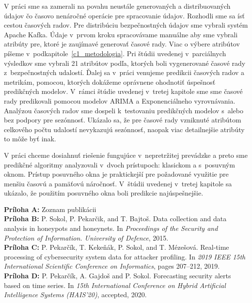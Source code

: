 \documentclass[thesismargins, thesislinespacing, openright, upjsfrontpage]{rnthesis}
\begin{document}
V práci sme sa zamerali na povahu neustále generovaných a distribuovaných údajov čo časovo nenáročné operácie pre spracovanie údajov. Rozhodli sme sa ísť cestou časových radov. Pre distribúciu bezpečnostných údajov sme vybrali systém Apache Kafka. Údaje v~prvom kroku spracovávame manuálne aby sme vybrali atribúty pre, ktoré je zaujímavé generovať časové rady. Viac o výbere atribútov píšeme v~podkapitole~\ref{c1_metodologia}. Pri štúdii uvedenej v~parciálnych výsledkov sme vybrali 21 atribútov podľa, ktorých boli vygenerované časové rady z~bezpečnostných udalostí. Ďalej sa v~práci venujeme predikcii časových radov a metrikám, pomocou, ktorých dokážeme oprávnene ohodnotiť úspešnosť predikčných modelov. V~rámci štúdie uvedenej v~tretej kapitole sme sme časové rady predikovali pomocou modelov ARIMA a Exponenciálneho vyrovnávania. Analýzou časových radov sme dospeli k~testovaniu predikčných modelov s~alebo bez podpory pre sezónnosť. Ukázalo sa, že pre časové rady vzniknuté atribútom celkového počtu udalostí nevykazujú sezónnosť, naopak viac detailnejšie atribúty to môže byť inak.

V práci chceme dosiahnuť riešenie fungujúce v~nepretržitej prevádzke a preto sme predikčné algoritmy analyzovali v~dvoch prístupoch: klasickom a s~posuvným oknom. Prístup posuvného okna je praktickejší pre požadované využitie pre menšiu časovú a pamäťovú náročnosť. V~štúdii uvedenej v~tretej kapitole sa ukázalo, že použitím posuvného okna boli predikcie najúspešnejšie.

%
%
\prilohy

\textbf{Príloha A:} Zoznam publikácii \\
\textbf{Príloha B:} P. Sokol, P. Pekarčik, and T. Bajtoš. Data collection and data analysis in honeypots and honeynets. In \textit{Proceedings of the Security and Protection of Information. University of Defence}, 2015. \\
\textbf{Príloha C:} P. Pekarčík, T. Kekeňák, P. Sokol, and T. Mézešová. Real-time processing of cybersecurity system data for attacker profiling. In \textit{2019 IEEE 15th International Scientific Conference on Informatics}, pages 207–212, 2019. \\
\textbf{Príloha D:} P. Pekarčík, A. Gajdoš and P. Sokol. Forecasting security alerts based on time series. In \textit{15th International Conference on Hybrid Artificial Intelligence Systems (HAIS’20)}, accepted, 2020.

\end{document}
